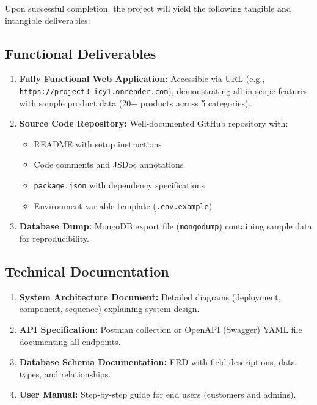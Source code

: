 Upon successful completion, the project will yield the following tangible and intangible deliverables:

\subsection{Functional Deliverables}

\begin{enumerate}
    \item \textbf{Fully Functional Web Application:} Accessible via URL (e.g., \texttt{https://project3-icy1.onrender.com}), demonstrating all in-scope features with sample product data (20+ products across 5 categories).
    
    \item \textbf{Source Code Repository:} Well-documented GitHub repository with:
    \begin{itemize}
        \item README with setup instructions
        \item Code comments and JSDoc annotations
        \item \texttt{package.json} with dependency specifications
        \item Environment variable template (\texttt{.env.example})
    \end{itemize}
    
    \item \textbf{Database Dump:} MongoDB export file (\texttt{mongodump}) containing sample data for reproducibility.
\end{enumerate}

\subsection{Technical Documentation}

\begin{enumerate}
    \item \textbf{System Architecture Document:} Detailed diagrams (deployment, component, sequence) explaining system design.
    
    \item \textbf{API Specification:} Postman collection or OpenAPI (Swagger) YAML file documenting all endpoints.
    
    \item \textbf{Database Schema Documentation:} ERD with field descriptions, data types, and relationships.
    
    \item \textbf{User Manual:} Step-by-step guide for end users (customers and admins).
\end{enumerate}

